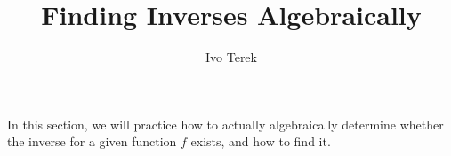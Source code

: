 \documentclass[nooutcomes]{ximera}
\author{Ivo Terek}
\title{Finding Inverses Algebraically}
\begin{document}
\licenseSZ
\begin{abstract}
  
\end{abstract}
\maketitle





In this section, we will practice how to actually algebraically determine whether the inverse for a given function $f$ exists, and how to find it.
\end{document}
